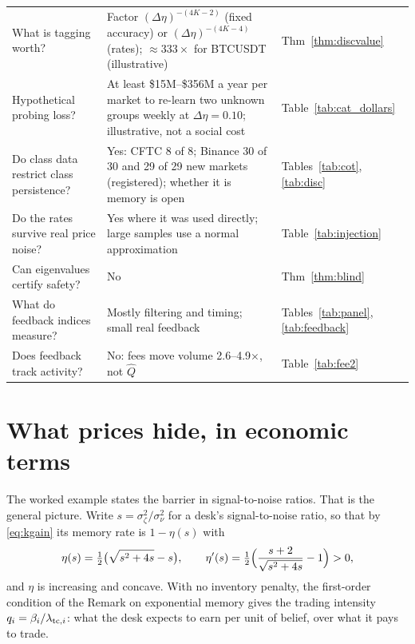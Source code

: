 \documentclass[12pt]{article}
\theoremstyle{definition}
\theoremstyle{remark}
\begin{document}
\begin{table}[t]
\begin{threeparttable}
\begin{tabular}{p{}p{}p{}}
What is tagging worth? & Factor $(\Delta\eta)^{-(4K-2)}$ (fixed accuracy) or $(\Delta\eta)^{-(4K-4)}$ (rates); $\approx333\times$ for BTCUSDT (illustrative) & Thm~\ref{thm:discvalue}\\
Hypothetical probing loss? & At least \$15M--\$356M a year per market to re-learn two unknown groups weekly at $\Delta\eta=0.10$; illustrative, not a social cost & Table~\ref{tab:cat_dollars}\\
Do class data restrict class persistence? & Yes: CFTC 8 of 8; Binance 30 of 30 and 29 of 29 new markets (registered); whether it is memory is open & Tables~\ref{tab:cot}, \ref{tab:disc}\\
Do the rates survive real price noise? & Yes where it was used directly; large samples use a normal approximation & Table~\ref{tab:injection}\\
Can eigenvalues certify safety? & No & Thm~\ref{thm:blind}\\
What do feedback indices measure? & Mostly filtering and timing; small real feedback & Tables~\ref{tab:panel}, \ref{tab:feedback}\\
Does feedback track activity? & No: fees move volume 2.6--4.9$\times$, not $\hat Q$ & Table~\ref{tab:fee2}\\
\bottomrule
\end{tabular}
\end{threeparttable}
\end{table}

\section{What prices hide, in economic terms}\label{sec:primitives}

The worked example states the barrier in signal-to-noise ratios. That is the general picture. Write $s=\sigma_\zeta^2/\sigma_\nu^2$ for a desk's signal-to-noise ratio, so that by \eqref{eq:kgain} its memory rate is $1-\eta(s)$ with
\[
\eta(s)=\tfrac12\bigl(\sqrt{s^2+4s}-s\bigr),\qquad \eta'(s)=\tfrac12\Bigl(\frac{s+2}{\sqrt{s^2+4s}}-1\Bigr)>0 ,
\]
and $\eta$ is increasing and concave. With no inventory penalty, the first-order condition of the Remark on exponential memory gives the trading intensity $q_i=\beta_i/\lambda_{{\rm tc},i}$: what the desk expects to earn per unit of belief, over what it pays to trade.
\end{document}
